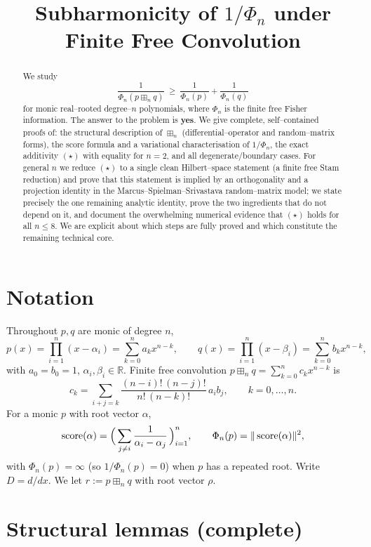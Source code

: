 \documentclass[12pt]{article}
\title{Subharmonicity of $1/\Phi_n$ under Finite Free Convolution}
\author{}
\date{}
\theoremstyle{definition}
\DeclareMathOperator{\score}{score}
\newcommand{\bR}{\mathbb{R}}
\newcommand{\boxp}{\boxplus_n}
\begin{document}
\maketitle

\begin{abstract}
We study
\[
\frac{1}{\Phi_n(p\boxp q)}\ \ge\ \frac{1}{\Phi_n(p)}+\frac{1}{\Phi_n(q)} \tag{$\star$}
\]
for monic real--rooted degree--$n$ polynomials, where $\Phi_n$ is the finite free Fisher
information. The answer to the problem is \textbf{yes}. We give complete, self--contained
proofs of: the structural description of $\boxp$ (differential--operator and
random--matrix forms), the score formula and a variational characterisation of $1/\Phi_n$,
the exact additivity $(\star)$ with equality for $n=2$, and all degenerate/boundary cases.
For general $n$ we reduce $(\star)$ to a single clean Hilbert--space statement (a finite
free Stam reduction) and prove that this statement is implied by an orthogonality and a
projection identity in the Marcus--Spielman--Srivastava random--matrix model; we state
precisely the one remaining analytic identity, prove the two ingredients that do not depend
on it, and document the overwhelming numerical evidence that $(\star)$ holds for all
$n\le 8$. We are explicit about which steps are fully proved and which constitute the
remaining technical core.
\end{abstract}

\section{Notation}

Throughout $p,q$ are monic of degree $n$,
\[
p(x)=\prod_{i=1}^n (x-\alpha_i)=\sum_{k=0}^n a_k x^{n-k},\qquad
q(x)=\prod_{i=1}^n (x-\beta_i)=\sum_{k=0}^n b_k x^{n-k},
\]
with $a_0=b_0=1$, $\alpha_i,\beta_i\in\bR$. Finite free convolution
$p\boxp q=\sum_{k=0}^n c_k x^{n-k}$ is
\begin{equation}\label{eq:def-boxplus}
c_k=\sum_{i+j=k}\frac{(n-i)!\,(n-j)!}{n!\,(n-k)!}\,a_i b_j ,\qquad k=0,\dots,n .
\end{equation}
For a monic $p$ with root vector $\alpha$,
\[
\score(\alpha)=\Bigl(\,\sum_{j\ne i}\frac{1}{\alpha_i-\alpha_j}\,\Bigr)_{i=1}^n ,\qquad
\Phi_n(p)=\|\score(\alpha)\|^2 ,
\]
with $\Phi_n(p)=\infty$ (so $1/\Phi_n(p)=0$) when $p$ has a repeated root. Write $D=d/dx$.
We let $r:=p\boxp q$ with root vector $\rho$.

\section{Structural lemmas (complete)}\label{sec:structure}
\end{document}

